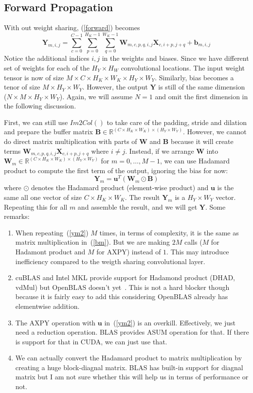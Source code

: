 \documentclass[authordraft=true,dvipsnames]{acmart}
\newcommand{\pref}[1]{(\ref{#1})}
\newcommand{\bx}[0]{\mathbf{X}}
\newcommand{\bw}[0]{\mathbf{W}}
\newcommand{\by}[0]{\mathbf{Y}}
\newcommand{\bb}[0]{\mathbf{B}}
\begin{document}
\subsection{Forward Propagation}
With out weight sharing, \pref{forward} becomes 
\begin{equation}
\by_{m, i,j}=\sum_{c=0}^{C-1}{\sum_{p=0}^{H_K-1}{\sum_{q=0}^{W_K-1}{\bw_{m,c,p,q,i,j}\bx_{c, i+p,j+q}}}} + \mathbf{b}_{m,i,j}
\end{equation} 
Notice the additional indices $i,j$ in the weights and biases. Since we have different set of weights for each of the $H_Y \times H_W$ convolutional locations. The input weight tensor is now of size $M  \times C \times H_K \times W_K \times H_Y \times W_Y$. Similarly, bias becomes a tenor of size $M \times H_Y \times W_Y$. However, the output $\by$ is still of the same dimension ($N \times M \times H_Y \times W_Y$). Again, we will assume $N=1$ and omit the first dimension in the following discussion.

First, we can still use $Im2Col()$ to take care of the padding, stride and dilation and prepare the buffer matrix $\bb  \in \mathbb{R}^{(C \times H_K \times W_K) \times (H_Y \times W_Y)}$. However, we cannot do direct matrix multiplication with parts of $\bw$ and $\mathbf{B}$ because it will create terms $\bw_{m,c,p,q,i,j}\bx_{c, i+p,j+q}$ where $i \neq j$. Instead, if we arrange $\bw$ into $\bw_m \in \mathbb{R} ^{(C \times H_K \times W_K) \times (H_Y \times W_Y)}$ for $m=0,\ldots,M-1$, we can use Hadamard product to compute the first term of the output, ignoring the bias for now:
\begin{equation} \label{ym2}
\by_m = \mathbf{u}^T (\bw_m \odot \bb)
\end{equation}
where $\odot$ denotes the Hadamard product (element-wise product) and $\mathbf{u}$ is the same all one vector of size $C \times H_K \times W_K$. The result $\by_m$ is a $H_Y \times W_Y$ vector. Repeating this for all $m$ and assemble the result, and we will get $\by$. Some remarks: 
\begin{enumerate}
\item When repeating~\pref{ym2} $M$ times, in terms of complexity, it is the same as matrix multiplication in~\pref{bm}. But we are making $2M$ calls ($M$ for Hadamont product and $M$ for AXPY) instead of $1$. This may introduce inefficiency compared to the weigth sharing convolutional layer. 
\item cuBLAS and Intel MKL provide support for Hadamond product (DHAD, vdMul) but OpenBLAS doesn't yet~\cite{openblas}. This is not a hard blocker though because it is fairly easy to add this considering OpenBLAS already has elementwise addition. 
\item The AXPY operation with $\mathbf{u}$ in~\pref{ym2} is an overkill. Effectively, we just need a reduction operation. BLAS provides ASUM operation for that. If there is support for that in CUDA, we can just use that. 
\item We can actually convert the Hadamard product to matrix multiplication by creating a huge block-diagnal matrix. BLAS has built-in support for diagnal matrix but I am not sure whether this will help us in terms of performance or not. 
\end{enumerate}
\end{document}
